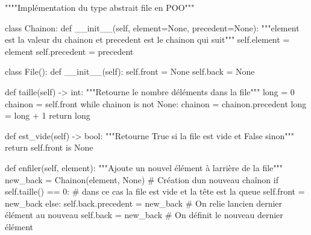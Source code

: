 \documentclass[
  letterpaper,
  DIV=11,
  numbers=noendperiod]{scrartcl}
\newenvironment{Shaded}{\begin{snugshade}}{\end{snugshade}}
\newcommand{\BuiltInTok}[1]{\textcolor[rgb]{0.00,0.23,0.31}{#1}}
\newcommand{\CommentTok}[1]{\textcolor[rgb]{0.37,0.37,0.37}{#1}}
\newcommand{\ControlFlowTok}[1]{\textcolor[rgb]{0.00,0.23,0.31}{#1}}
\newcommand{\DecValTok}[1]{\textcolor[rgb]{0.68,0.00,0.00}{#1}}
\newcommand{\FunctionTok}[1]{\textcolor[rgb]{0.28,0.35,0.67}{#1}}
\newcommand{\KeywordTok}[1]{\textcolor[rgb]{0.00,0.23,0.31}{#1}}
\newcommand{\NormalTok}[1]{\textcolor[rgb]{0.00,0.23,0.31}{#1}}
\newcommand{\OperatorTok}[1]{\textcolor[rgb]{0.37,0.37,0.37}{#1}}
\newcommand{\VariableTok}[1]{\textcolor[rgb]{0.07,0.07,0.07}{#1}}
\begin{document}
\begin{Shaded}
\begin{Highlighting}[]
\CommentTok{""""Implémentation du type abstrait file en POO"""}


\KeywordTok{class}\NormalTok{ Chainon:}
    \KeywordTok{def} \FunctionTok{\_\_init\_\_}\NormalTok{(}\VariableTok{self}\NormalTok{, element}\OperatorTok{=}\VariableTok{None}\NormalTok{, precedent}\OperatorTok{=}\VariableTok{None}\NormalTok{):}
        \CommentTok{"""element est la valeur du chainon et precedent est le chainon qui suit"""}
        \VariableTok{self}\NormalTok{.element }\OperatorTok{=}\NormalTok{ element}
        \VariableTok{self}\NormalTok{.precedent }\OperatorTok{=}\NormalTok{ precedent}


\KeywordTok{class}\NormalTok{ File():}
    \KeywordTok{def} \FunctionTok{\_\_init\_\_}\NormalTok{(}\VariableTok{self}\NormalTok{):}
        \VariableTok{self}\NormalTok{.front }\OperatorTok{=} \VariableTok{None}
        \VariableTok{self}\NormalTok{.back }\OperatorTok{=} \VariableTok{None}

    \KeywordTok{def}\NormalTok{ taille(}\VariableTok{self}\NormalTok{) }\OperatorTok{{-}\textgreater{}} \BuiltInTok{int}\NormalTok{:}
        \CommentTok{"""Retourne le nombre d\textquotesingle{}éléments dans la file"""}
        \BuiltInTok{long} \OperatorTok{=} \DecValTok{0}
\NormalTok{        chainon }\OperatorTok{=} \VariableTok{self}\NormalTok{.front}
        \ControlFlowTok{while}\NormalTok{ chainon }\KeywordTok{is} \KeywordTok{not} \VariableTok{None}\NormalTok{:}
\NormalTok{            chainon }\OperatorTok{=}\NormalTok{ chainon.precedent}
            \BuiltInTok{long} \OperatorTok{=} \BuiltInTok{long} \OperatorTok{+} \DecValTok{1}
        \ControlFlowTok{return} \BuiltInTok{long}

    \KeywordTok{def}\NormalTok{ est\_vide(}\VariableTok{self}\NormalTok{) }\OperatorTok{{-}\textgreater{}} \BuiltInTok{bool}\NormalTok{:}
        \CommentTok{"""Retourne True si la file est vide et False sinon"""}
        \ControlFlowTok{return} \VariableTok{self}\NormalTok{.front }\KeywordTok{is} \VariableTok{None}

    \KeywordTok{def}\NormalTok{ enfiler(}\VariableTok{self}\NormalTok{, element):}
        \CommentTok{"""Ajoute un nouvel élément à l\textquotesingle{}arrière de la file"""}
\NormalTok{        new\_back }\OperatorTok{=}\NormalTok{ Chainon(element, }\VariableTok{None}\NormalTok{)   }\CommentTok{\# Création d\textquotesingle{}un nouveau chaînon}
        \ControlFlowTok{if} \VariableTok{self}\NormalTok{.taille() }\OperatorTok{==} \DecValTok{0}\NormalTok{:}
            \CommentTok{\# dans ce cas la file est vide et la tête est la queue}
            \VariableTok{self}\NormalTok{.front }\OperatorTok{=}\NormalTok{ new\_back}
        \ControlFlowTok{else}\NormalTok{:}
            \VariableTok{self}\NormalTok{.back.precedent }\OperatorTok{=}\NormalTok{ new\_back    }\CommentTok{\# On relie l\textquotesingle{}ancien dernier élément au nouveau}
        \VariableTok{self}\NormalTok{.back }\OperatorTok{=}\NormalTok{ new\_back    }\CommentTok{\# On définit le nouveau dernier élément}


\end{Highlighting}
\end{Shaded}
\end{document}
